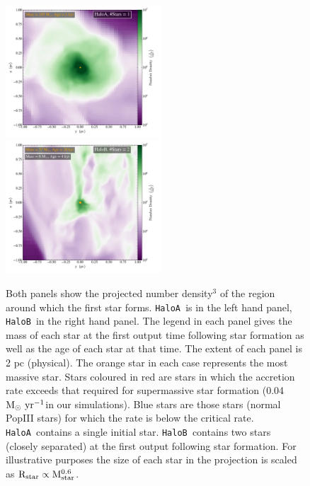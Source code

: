 \documentclass[graphics, twocolumn, usenatbib]{mn2e}
\newcommand{\msolaryrc} {$\rm{M_{\odot}~yr^{-1}}$}
\newcommand{\ha} {\texttt{HaloA~}}
\newcommand{\hb} {\texttt{HaloB~}}
\begin{document}
\begin{figure} 
\centering
\begin{minipage}{175mm}      \begin{center} 
\centerline{
\includegraphics[width=0.52\textwidth]{FIGURES/HaloA/Proj_z_number_density_0001.pdf}
\includegraphics[width=0.52\textwidth]{FIGURES/HaloB/Proj_z_number_density_0028.pdf}}
\caption{Both panels show the projected number density$^3$ of the region around which the first
  star forms. \ha is in the left hand panel, \hb in the right hand panel.
  The legend in each panel gives the mass of each star at the first output time following star
  formation as well as the age of each star at that time. The extent of each panel is 2 pc (physical). The orange
  star in each case represents the most massive star. Stars coloured in red are stars in which the accretion rate
  exceeds that required for supermassive star formation (0.04 \msolaryrc in our simulations).
  Blue stars are those stars
  (normal PopIII stars) for
  which the rate is below the critical rate. \ha contains a single initial star. \hb contains two stars (closely separated)
  at the first output following star formation. For illustrative purposes the size of each star in the
projection is scaled as $\rm{R_{star}} \propto \rm{M_{star}^{0.6}}$.}\label{Fig:ProjectionStart}
\end{center} \end{minipage}

\end{figure}
\end{document}
